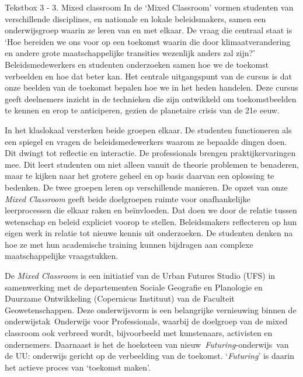 \documentclass[smallauthor, chapterhaspagenum, nochapterinheader, pagenuminheader,  bigchapnum,medium2, tocpages,  garamond, titleinheader]{jote-book}
\begin{document}
	\begin{bookbox}{Tekstbox 3 - 3. Mixed classroom}
		In de ‘Mixed Classroom' vormen studenten van verschillende disciplines, en nationale en lokale beleidsmakers, samen een onderwijsgroep waarin ze leren van en met elkaar. De vraag die centraal staat is ‘Hoe bereiden we ons voor op een toekomst waarin die door klimaatverandering en andere grote maatschappelijke transities wezenlijk anders zal zijn?' Beleidsmedewerkers en studenten onderzoeken samen hoe we de toekomst verbeelden en hoe dat beter kan. Het centrale uitgangspunt van de cursus is dat onze beelden van de toekomst bepalen hoe we in het heden handelen. Deze cursus geeft deelnemers inzicht in de technieken die zijn ontwikkeld om toekomstbeelden te kennen en erop te anticiperen, gezien de planetaire crisis van de 21e eeuw.

		\vspace*{\baselineskip}

		In het klaslokaal versterken beide groepen elkaar. De studenten functioneren als een spiegel en vragen de beleidsmedewerkers waarom ze bepaalde dingen doen. Dit dwingt tot reflectie en interactie. De professionals brengen praktijkervaringen mee. Dit leert studenten om niet alleen vanuit de theorie problemen te benaderen, maar te kijken naar het grotere geheel en op basis daarvan een oplossing te bedenken. De twee groepen leren op verschillende manieren. De opzet van onze \emph{Mixed Classroom} geeft beide doelgroepen ruimte voor onafhankelijke leerprocessen die elkaar raken en beïnvloeden. Dat doen we door de relatie tussen wetenschap en beleid expliciet voorop te stellen. Beleidsmakers reflecteren op hun eigen werk in relatie tot nieuwe kennis uit onderzoeken. De studenten denken na hoe ze met hun academische training kunnen bijdragen aan complexe maatschappelijke vraagstukken.

		\vspace*{\baselineskip}

		De \emph{Mixed Classroom} is een initiatief van de Urban Futures Studio (UFS) in samenwerking met de departementen Sociale Geografie en Planologie en Duurzame Ontwikkeling (Copernicus Instituut) van de Faculteit Geowetenschappen. Deze onderwijsvorm is een belangrijke vernieuwing binnen de onderwijstak Onderwijs voor Professionals, waarbij de doelgroep van de mixed classroom ook verbreed wordt, bijvoorbeeld met kunstenaars, activisten en ondernemers. Daarnaast is het de hoeksteen van nieuw \emph{Futuring}-onderwijs van de UU: onderwijs gericht op de verbeelding van de toekomst. ‘\emph{Futuring}' is daarin het actieve proces van ‘toekomst maken'.
	\end{bookbox}
\end{document}
